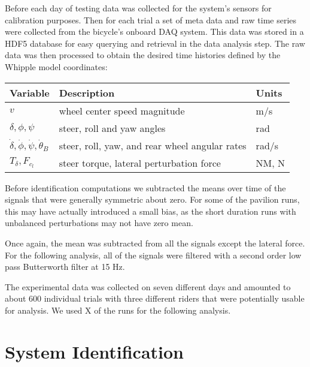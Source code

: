 \documentclass[a4paper]{article}
\begin{document}
Before each day of testing data was collected for the system's sensors for
calibration purposes. Then for each trial a set of meta data and raw time
series were collected from the bicycle's onboard DAQ system. This data was
stored in a HDF5 database for easy querying and retrieval in the data analysis
step. The raw data was then processed to obtain the desired time histories
defined by the Whipple model coordinates:

\begin{table}
  \begin{tabular}{lll}
    Variable                                            & Description                                    & Units \\
    \hline
    $v$                                                 & wheel center speed magnitude                   & m/s \\
    $\delta,\phi,\psi$                                  & steer, roll and yaw angles                     & rad \\
    $\dot{\delta},\dot{\phi},\dot{\psi},\dot{\theta}_B$ & steer, roll, yaw, and rear wheel angular rates & rad/s \\
    $T_\delta,F_{c_l}$                                  & steer torque, lateral perturbation force       & NM, N
  \end{tabular}
\end{table}

Before identification computations we subtracted the means over time of the
signals that were generally symmetric about zero. For some of the pavilion
runs, this may have actually introduced a small bias, as the short duration
runs with unbalanced perturbations may not have zero mean.

 Once again, the mean was
subtracted from all the signals except the lateral force.
 For
the following analysis, all of the signals were filtered with a second order
low pass Butterworth filter at 15 Hz. 


The experimental data was collected on seven different days and amounted to
about 600 individual trials with three different riders that were potentially
usable for analysis. We used X of the runs for the following analysis.

\section{System Identification}
\end{document}
